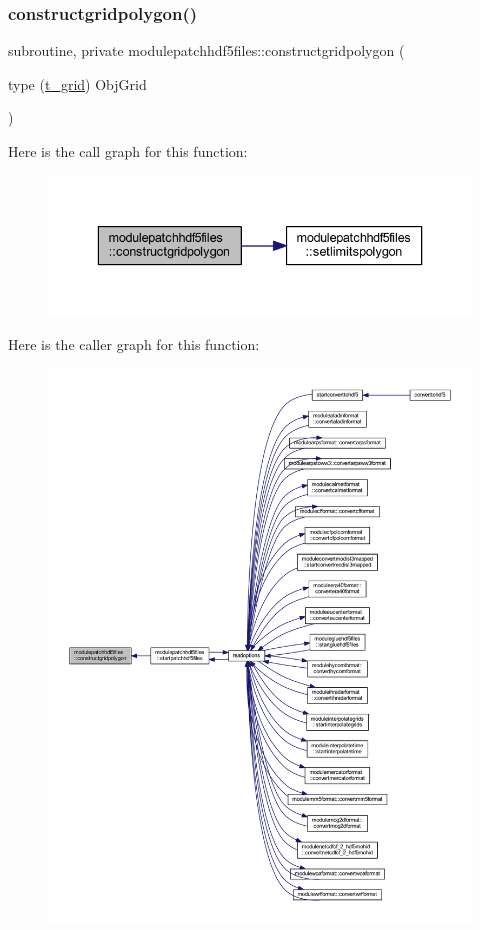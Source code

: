 \subsubsection{\texorpdfstring{constructgridpolygon()}{constructgridpolygon()}}
{\footnotesize\ttfamily subroutine, private modulepatchhdf5files\+::constructgridpolygon (\begin{DoxyParamCaption}\item[{type (\mbox{\hyperlink{structmodulepatchhdf5files_1_1t__grid}{t\+\_\+grid}})}]{Obj\+Grid }\end{DoxyParamCaption})\hspace{0.3cm}{\ttfamily [private]}}

Here is the call graph for this function\+:\nopagebreak
\begin{figure}[H]
\begin{center}
\leavevmode
\includegraphics[width=336pt]{namespacemodulepatchhdf5files_aa75e619d235deca359ee164e27280e4c_cgraph}
\end{center}
\end{figure}
Here is the caller graph for this function\+:\nopagebreak
\begin{figure}[H]
\begin{center}
\leavevmode
\includegraphics[width=350pt]{namespacemodulepatchhdf5files_aa75e619d235deca359ee164e27280e4c_icgraph}
\end{center}
\end{figure}
